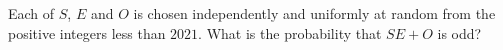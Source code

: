 Each of $S$, $E$ and $O$ is chosen independently and uniformly at random from the positive integers less than $2021$. What is the probability that $SE+O$ is odd?
